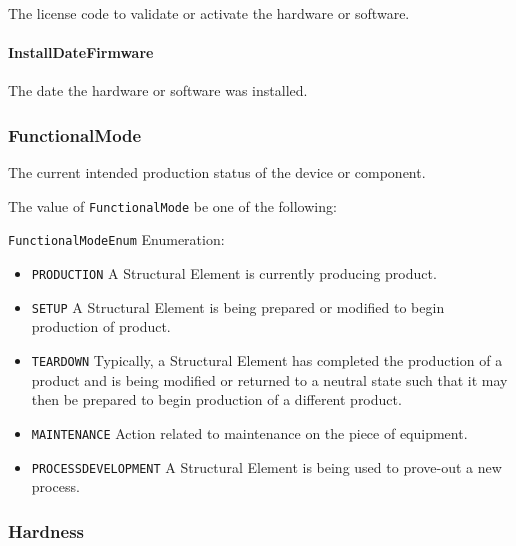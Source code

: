 The license code to validate or activate the hardware or software.


\paragraph{InstallDateFirmware}\mbox{}
\label{sec:InstallDateFirmware}


The date the hardware or software was installed.


\subsubsection{FunctionalMode}
\label{sec:FunctionalMode}



The current intended production status of the device or component.


The value of \texttt{FunctionalMode} \MUST be one of the following: 


\texttt{FunctionalModeEnum} Enumeration:

\begin{itemize}
\item \texttt{PRODUCTION} \newline A \gls{Structural Element} is currently producing product. 
\item \texttt{SETUP} \newline A \gls{Structural Element} is being prepared or modified to begin production of product. 
\item \texttt{TEARDOWN} \newline Typically, a \gls{Structural Element} has completed the production of a product and is being modified or returned to a neutral state such that it may then be prepared to begin production of a different product. 
\item \texttt{MAINTENANCE} \newline Action related to maintenance on the piece of equipment. 
\item \texttt{PROCESS\textunderscore DEVELOPMENT} \newline A \gls{Structural Element} is being used to prove-out a new process. 
\end{itemize}

\FloatBarrier

\subsubsection{Hardness}
\label{sec:Hardness}



